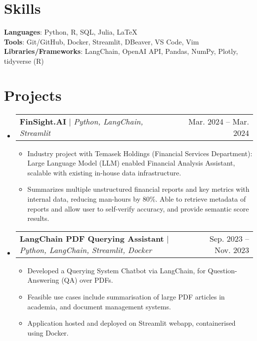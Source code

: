 \documentclass[letterpaper,11pt]{article}
\makeatletter
\newcommand{\resumeItem}[1]{
  \item\small{
    {#1 \vspace{-2pt}}
  }
}
\newcommand{\resumeProjectHeading}[2]{
    \item
    \begin{tabular*}{1.001\textwidth}{l@{\extracolsep{\fill}}r}
      \small#1 & \small #2\\
    \end{tabular*}\vspace{-7pt}
}
\newcommand{\resumeSubHeadingListStart}{\begin{itemize}[leftmargin=0.0in, label={}]}
\newcommand{\resumeSubHeadingListEnd}{\end{itemize}}
\newcommand{\resumeItemListStart}{\begin{itemize}}
\newcommand{\resumeItemListEnd}{\end{itemize}\vspace{-5pt}}
\makeatother
\begin{document}
%
\section{Skills}
  \begin{itemize}[leftmargin=0.15in, label={}]
      \small{\item{
      \textbf{Languages}{: Python, R, SQL, Julia, \LaTeX} \\
      \textbf{Tools}{: Git/GitHub, Docker, Streamlit, DBeaver, VS Code, Vim} \\
      \textbf{Libraries/Frameworks}{: LangChain, OpenAI API, Pandas, NumPy, Plotly, tidyverse (R)}  \\
      }}
  \end{itemize} 

\section{Projects}
    
    \resumeSubHeadingListStart
      \resumeProjectHeading
          {\textbf{FinSight.AI} $|$ \emph{Python, LangChain, Streamlit}}{Mar. 2024 -- Mar. 2024}
          \resumeItemListStart
            \resumeItem{Industry project with Temasek Holdings (Financial Services Department): Large Language Model (LLM) enabled Financial Analysis Assistant, scalable with existing in-house data infrastructure.}
            \resumeItem{Summarizes multiple unstructured financial reports and key metrics with internal data, reducing man-hours by 80\%. Able to retrieve metadata of reports and allow user to self-verify accuracy, and provide semantic score results.}
          \resumeItemListEnd
          \vspace{-13pt}
    \resumeSubHeadingListEnd

    \resumeSubHeadingListStart
      \resumeProjectHeading
          {\textbf{LangChain PDF Querying Assistant} $|$ \emph{Python, LangChain, Streamlit, Docker}}{Sep. 2023 -- Nov. 2023}
          \resumeItemListStart
            \resumeItem{Developed a Querying System Chatbot via LangChain, for Question-Answering (QA) over PDFs.}
            \resumeItem{Feasible use cases include summarisation of large PDF articles in academia, and document management systems.}
            \resumeItem{Application hosted and deployed on Streamlit webapp, containerised using Docker.}
          \resumeItemListEnd
    \resumeSubHeadingListEnd
\end{document}
